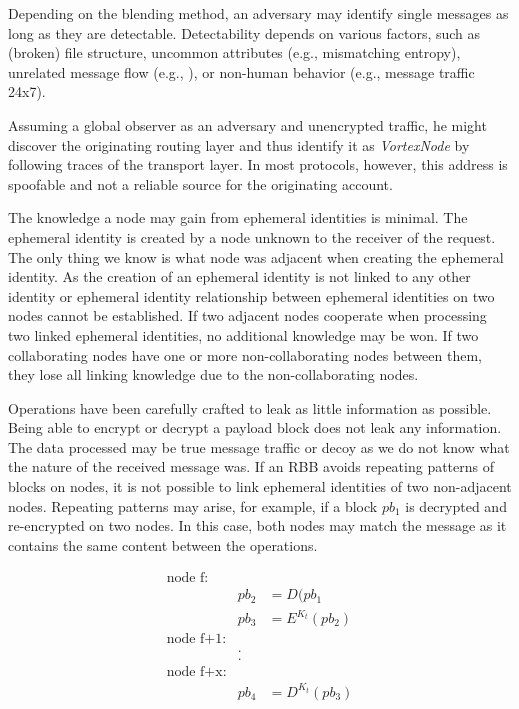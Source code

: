 \documentclass[acmsmall, screen, final, natbib=false]{acmart}
\begin{document}
	Depending on the blending method, an adversary may identify single messages as long as they are detectable. Detectability depends on various factors, such as (broken) file structure, uncommon attributes (e.g., mismatching entropy), unrelated message flow (e.g., \cite{oakland2013-parrot}), or non-human behavior (e.g., message traffic 24x7).
	
	Assuming a global observer as an adversary and unencrypted traffic, he might discover the originating routing layer and thus identify it as \emph{VortexNode} by following traces of the transport layer. In most protocols, however, this address is spoofable and not a reliable source for the originating account.
	
	The knowledge a node may gain from ephemeral identities is minimal. The ephemeral identity is created by a node unknown to the receiver of the request. The only thing we know is what node was adjacent when creating the ephemeral identity. As the creation of an ephemeral identity is not linked to any other identity or ephemeral identity relationship between ephemeral identities on two nodes cannot be established. If two adjacent nodes cooperate when processing two linked ephemeral identities, no additional knowledge may be won. If two collaborating nodes have one or more non-collaborating nodes between them, they lose all linking knowledge due to the non-collaborating nodes. 
	
	Operations have been carefully crafted to leak as little information as possible. Being able to encrypt or decrypt a payload block does not leak any information. The data processed may be true message traffic or decoy as we do not know what the nature of the received message was. If an RBB avoids repeating patterns of blocks on nodes, it is not possible to link ephemeral identities of two non-adjacent nodes. Repeating patterns may arise, for example, if a block $pb_1$ is decrypted and re-encrypted on two nodes. In this case, both nodes may match the message as it contains the same content between the operations.
	
	\begin{eqnarray*}
		\text{node f:}\\
		& pb_2 & = D(pb_1\\
		& pb_3 & = E^{K_t}(pb_2)\\
		\text{node f+1:}\\
		&.\\
		&.\\    
		\text{node f+x:}\\
		& pb_4 & = D^{K_t}(pb_3)\\
	\end{eqnarray*}
	
\end{document}
